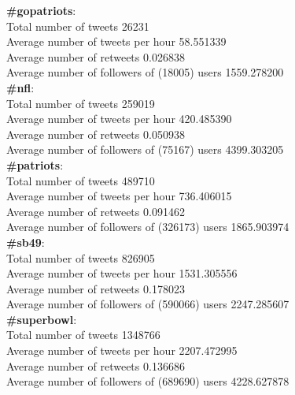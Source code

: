 \documentclass[12pt]{article}
\begin{document}
\textbf{\#gopatriots}: \\
Total number of tweets 26231 \\
Average number of tweets per hour 58.551339 \\
Average number of retweets 0.026838 \\
Average number of followers of (18005) users 1559.278200 \\

\textbf{\#nfl}: \\
Total number of tweets 259019 \\ 
Average number of tweets per hour 420.485390 \\
Average number of retweets 0.050938 \\
Average number of followers of (75167) users 4399.303205 \\

\textbf{\#patriots}: \\
Total number of tweets 489710 \\
Average number of tweets per hour 736.406015 \\
Average number of retweets 0.091462 \\
Average number of followers of (326173) users 1865.903974 \\

\textbf{\#sb49}: \\
Total number of tweets 826905 \\
Average number of tweets per hour 1531.305556 \\
Average number of retweets 0.178023 \\
Average number of followers of (590066) users 2247.285607 \\

\textbf{\#superbowl}: \\
Total number of tweets 1348766 \\
Average number of tweets per hour 2207.472995 \\
Average number of retweets 0.136686 \\
Average number of followers of (689690) users 4228.627878 \\
\end{document}
